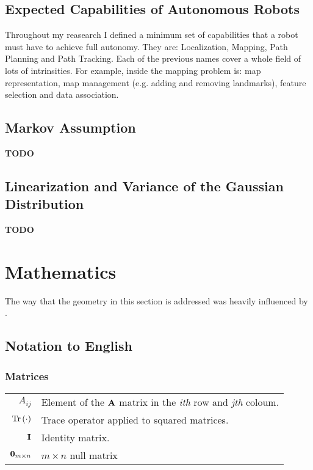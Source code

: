 \documentclass[12pt]{article}
\begin{document}
\subsection{Expected Capabilities of Autonomous Robots}
Throughout my reasearch I defined a minimum set of capabilities
that a robot must have to achieve full autonomy. They are:
Localization, Mapping, Path Planning and Path Tracking. Each 
of the previous names cover a whole field of lots of intrinsities.
For example, inside the mapping problem is: map representation, 
map management (e.g. adding and removing landmarks), feature 
selection and data association.

\subsection{Markov Assumption}
\color{magenta}
\textbf{TODO}
\color{black}

\subsection{Linearization and Variance of the Gaussian Distribution}
\color{magenta}
\textbf{TODO}
\color{black}

\section{Mathematics}
The way that the geometry in this section is addressed was heavily influenced by \cite{lynch2017modern}.

\subsection{Notation to English}
\subsubsection*{Matrices}
\begin{table}[h]
    \centering
    \begin{tabularx}{\textwidth}{|rX|}
        \hline
         $A_{ij}$ & Element of the $\boldsymbol{\mathbf{A}}$ matrix in the \textit{ith} row and \textit{jth} coloum. \\
         $\operatorname{Tr}\left(\cdot\right)$ & Trace operator applied to squared matrices.\\
         $\boldsymbol{\mathbf{I}}$ & Identity matrix.  \\
         $\boldsymbol{\mathbf{0}}_{m\times n}$ & $m\times n$ null matrix
         \\ \hline
    \end{tabularx}
    \label{tab:my_label}
\end{table}
\end{document}
